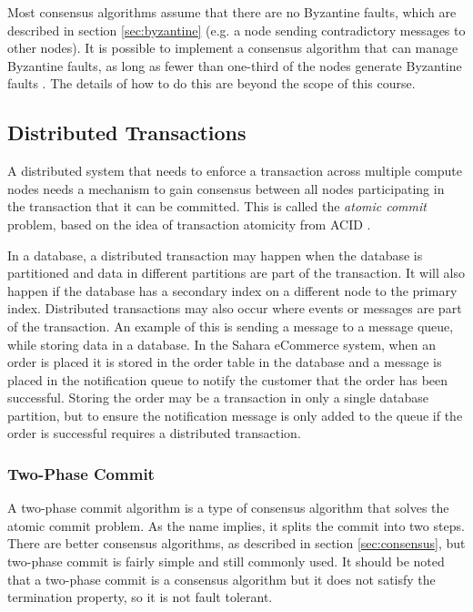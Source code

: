 Most consensus algorithms assume that there are no Byzantine faults, which are described in section \ref{sec:byzantine}
(e.g. a node sending contradictory messages to other nodes).
It is possible to implement a consensus algorithm that can manage Byzantine faults,
as long as fewer than one-third of the nodes generate Byzantine faults \cite{byzantine-tolerance-2002}.
The details of how to do this are beyond the scope of this course.

\subsection{Distributed Transactions}

A distributed system that needs to enforce a transaction across multiple compute nodes
needs a mechanism to gain consensus between all nodes participating in the transaction that it can be committed.
This is called the \emph{atomic commit} problem, based on the idea of transaction atomicity from ACID \cite{distributed2-notes}.

In a database, a distributed transaction may happen when the database is partitioned and data in different partitions are part of the transaction.
It will also happen if the database has a secondary index on a different node to the primary index.
Distributed transactions may also occur where events or messages are part of the transaction.
An example of this is sending a message to a message queue, while storing data in a database.
In the Sahara eCommerce system, when an order is placed it is stored in the order table in the database
and a message is placed in the notification queue to notify the customer that the order has been successful.
Storing the order may be a transaction in only a single database partition,
but to ensure the notification message is only added to the queue if the order is successful requires a distributed transaction.

\subsubsection{Two-Phase Commit}\label{sec:2pr}
A two-phase commit algorithm is a type of consensus algorithm that solves the atomic commit problem.
As the name implies, it splits the commit into two steps.
There are better consensus algorithms, as described in section \ref{sec:consensus},
but two-phase commit is fairly simple and still commonly used.
It should be noted that a two-phase commit is a consensus algorithm
but it does not satisfy the termination property, so it is not fault tolerant.

